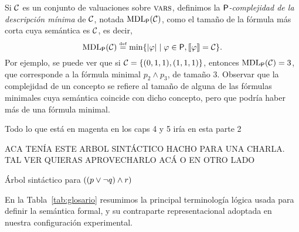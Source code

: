 Si $\mathcal{C}$ es un conjunto de valuaciones sobre $\textsc{vars}$, definimos la {\em ${\sf P}$-complejidad de la descripción mínima} de $\mathcal{C}$, notada ${\rm MDL}_{{\sf P}}(\mathcal{C})$, como el tamaño de la fórmula más corta cuya semántica es $\mathcal{C}$, es decir,
$$
{\rm MDL}_{{\sf P}}(\mathcal{C})\stackrel{\scriptscriptstyle \mathrm{def}}{=}\min\{|\varphi|\mid \varphi\in{\sf P},\llbracket \varphi\rrbracket=\mathcal{C}\}.
$$
Por ejemplo, se puede ver que si $\mathcal{C}=\{(0,1,1), (1,1,1)\}$, entonces ${\rm MDL}_{{\sf P}}(\mathcal{C})=3$, que corresponde a la fórmula minimal $p_2\wedge p_3$, de tamaño 3. Observar que la complejidad de un concepto se refiere al tamaño de alguna de las fórmulas minimales cuya semántica coincide con dicho concepto, pero que podría haber más de una fórmula minimal.


    
    
\renewcommand{\thetable}{\arabic{chapter}.\arabic{figure}}
\renewcommand{\thefigure}{\arabic{chapter}.\arabic{figure}}    

\color{magenta}
    
    Todo lo que está en magenta en los caps 4 y 5 iría en esta parte 2

\color{red}
ACA TENÍA ESTE ARBOL SINTÁCTICO HACHO PARA UNA CHARLA. TAL VER QUIERAS APROVECHARLO ACÁ O EN OTRO LADO

Árbol sintáctico para $((p \vee \lnot q) \wedge r)$




En la Tabla~\ref{tab:glosario} resumimos la principal terminología lógica usada para definir la semántica formal, y su contraparte representacional adoptada en nuestra configuración experimental.

